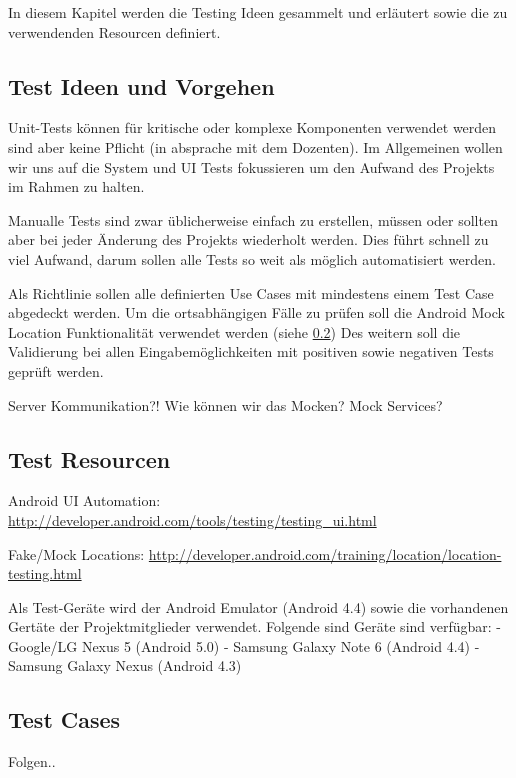 In diesem Kapitel werden die Testing Ideen gesammelt und erläutert sowie die zu verwendenden Resourcen definiert.

\subsection{Test Ideen und Vorgehen}
Unit-Tests können für kritische oder komplexe Komponenten verwendet werden sind aber keine Pflicht (in absprache mit dem Dozenten). 
Im Allgemeinen wollen wir uns auf die System und UI Tests fokussieren um den Aufwand des Projekts im Rahmen zu halten.

Manualle Tests sind zwar üblicherweise einfach zu erstellen, müssen oder sollten aber bei jeder Änderung des Projekts wiederholt werden. Dies führt schnell zu viel Aufwand, darum sollen alle Tests so weit als möglich automatisiert werden.

Als Richtlinie sollen alle definierten Use Cases mit mindestens einem Test Case abgedeckt werden. Um die ortsabhängigen Fälle zu prüfen soll die Android Mock Location Funktionalität verwendet werden (siehe \ref{test_resources})
Des weitern soll die Validierung bei allen Eingabemöglichkeiten mit positiven sowie negativen Tests geprüft werden.

Server Kommunikation?! Wie können wir das Mocken? Mock Services?

\subsection{Test Resourcen}
\label{test_resources}
Android UI Automation: \url{http://developer.android.com/tools/testing/testing_ui.html}

Fake/Mock Locations: \url{http://developer.android.com/training/location/location-testing.html}

Als Test-Geräte wird der Android Emulator (Android 4.4) sowie die vorhandenen Gertäte der Projektmitglieder verwendet. 
Folgende sind Geräte sind verfügbar:
- Google/LG Nexus 5 (Android 5.0)
- Samsung Galaxy Note 6 (Android 4.4)
- Samsung Galaxy Nexus (Android 4.3)


\subsection{Test Cases}
Folgen..
